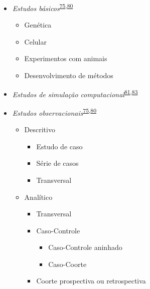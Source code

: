 \documentclass[
]{book}
\providecommand{\tightlist}{%
  \setlength{\itemsep}{0pt}\setlength{\parskip}{0pt}}
\begin{document}
\begin{itemize}
\tightlist
\item
  \emph{Estudos básicos}\textsuperscript{\protect\hyperlink{ref-Suxfct2014}{75},\protect\hyperlink{ref-Chidambaram2019}{80}}

  \begin{itemize}
  \tightlist
  \item
    Genética
  \item
    Celular
  \item
    Experimentos com animais
  \item
    Desenvolvimento de métodos
  \end{itemize}
\end{itemize}

\begin{itemize}
\tightlist
\item
  \emph{Estudos de simulação computacional}\textsuperscript{\protect\hyperlink{ref-Erdemir2020}{81},\protect\hyperlink{ref-chipman2022}{83}}
\end{itemize}

\begin{itemize}
\tightlist
\item
  \emph{Estudos observacionais}\textsuperscript{\protect\hyperlink{ref-Suxfct2014}{75},\protect\hyperlink{ref-Chidambaram2019}{80}}

  \begin{itemize}
  \tightlist
  \item
    Descritivo

    \begin{itemize}
    \tightlist
    \item
      Estudo de caso
    \item
      Série de casos
    \item
      Transversal
    \end{itemize}
  \item
    Analítico

    \begin{itemize}
    \tightlist
    \item
      Transversal
    \item
      Caso-Controle

      \begin{itemize}
      \tightlist
      \item
        Caso-Controle aninhado
      \item
        Caso-Coorte
      \end{itemize}
    \item
      Coorte prospectiva ou retrospectiva
    \end{itemize}
  \end{itemize}
\end{itemize}
\end{document}
